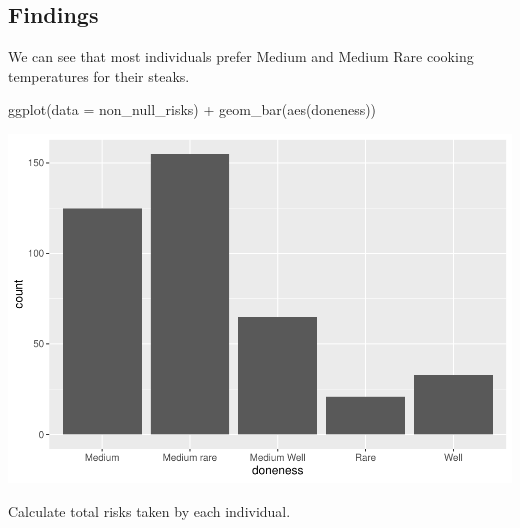 \documentclass[
]{article}
\newenvironment{Shaded}{\begin{snugshade}}{\end{snugshade}}
\newcommand{\AttributeTok}[1]{\textcolor[rgb]{0.77,0.63,0.00}{#1}}
\newcommand{\FunctionTok}[1]{\textcolor[rgb]{0.00,0.00,0.00}{#1}}
\newcommand{\NormalTok}[1]{#1}
\newcommand{\SpecialCharTok}[1]{\textcolor[rgb]{0.00,0.00,0.00}{#1}}
\begin{document}
\hypertarget{findings}{%
\subsection{Findings}\label{findings}}

We can see that most individuals prefer Medium and Medium Rare cooking
temperatures for their steaks.

\begin{Shaded}
\begin{Highlighting}[]
\FunctionTok{ggplot}\NormalTok{(}\AttributeTok{data =}\NormalTok{ non\_null\_risks) }\SpecialCharTok{+}
  \FunctionTok{geom\_bar}\NormalTok{(}\FunctionTok{aes}\NormalTok{(doneness))}
\end{Highlighting}
\end{Shaded}

\includegraphics{how_americans_like_their_steak_files/figure-latex/barplot-1.pdf}

Calculate total risks taken by each individual.
\end{document}
